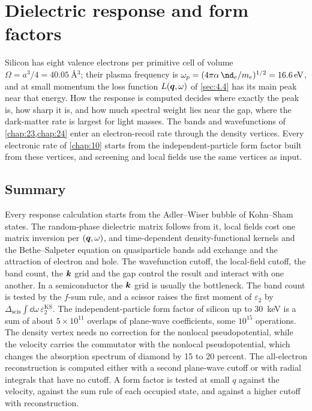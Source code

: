 \chapter{Dielectric response and form factors}\label{chap:26}

Silicon has eight valence electrons per primitive cell of volume $\Omega = a^3/4 = \SI{40.05}{\angstrom^3}$; their plasma frequency is $\omega_p = (4\pi\alpha\,\nd_e/m_e)^{1/2} = \SI{16.6}{eV}$, and at small momentum the loss function $L(\bm{q},\omega)$ of \cref{sec:4.4} has its main peak near that energy. How the response is computed decides where exactly the peak is, how sharp it is, and how much spectral weight lies near the gap, where the dark-matter rate is largest for light masses. The bands and wavefunctions of \cref{chap:23,chap:24} enter an electron-recoil rate through the density vertices. Every electronic rate of \cref{chap:10} starts from the independent-particle form factor built from these vertices, and screening and local fields use the same vertices as input.




\section*{Summary}

Every response calculation starts from the Adler--Wiser bubble of Kohn--Sham states. The random-phase dielectric matrix follows from it, local fields cost one matrix inversion per $(\bm{q},\omega)$, and time-dependent density-functional kernels and the Bethe--Salpeter equation on quasiparticle bands add exchange and the attraction of electron and hole. The wavefunction cutoff, the local-field cutoff, the band count, the $\bm{k}$ grid and the gap control the result and interact with one another. In a semiconductor the $\bm{k}$ grid is usually the bottleneck. The band count is tested by the $f$-sum rule, and a scissor raises the first moment of $\varepsilon_2$ by $\Delta_{\mathrm{scis}}\int\dd\omega\,\varepsilon_2^{\mathrm{KS}}$. The independent-particle form factor of silicon up to \SI{30}{keV} is a sum of about $5\times10^{11}$ overlaps of plane-wave coefficients, some $10^{15}$ operations. The density vertex needs no correction for the nonlocal pseudopotential, while the velocity carries the commutator with the nonlocal pseudopotential, which changes the absorption spectrum of diamond by 15 to 20 percent. The all-electron reconstruction is computed either with a second plane-wave cutoff or with radial integrals that have no cutoff. A form factor is tested at small $q$ against the velocity, against the sum rule of each occupied state, and against a higher cutoff with reconstruction.

\printbibliography[heading=subbibliography]
